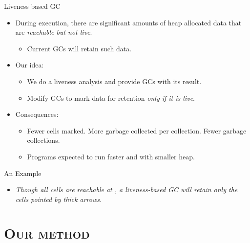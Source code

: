 \documentclass[xcolor=x11names,compress,mathserif]{beamer}
\renewcommand{\(}{\begin{columns}}
\renewcommand{\)}{\end{columns}}
\newcommand{\<}[1]{\begin{column}{#1}}
\renewcommand{\>}{\end{column}}
\begin{document}
\begin{frame}{Liveness based GC}
    \begin{itemize}\itemsep0.75em
    \item During execution, there are significant amounts of heap allocated data
      that  are {\em  reachable but not live}.
      \begin{itemize}
      \item Current GCs will retain such data.
      \end{itemize}
    \item Our idea: 
      \begin{itemize}
      \item We do a liveness analysis and provide GCs with its result.
      \item Modify GCs to mark data for retention {\em only if it is live}.
      \end{itemize}
    \item Consequences:
      \begin{itemize}
      \item  Fewer cells  marked.  \pause More  garbage collected  per
        collection. \pause Fewer garbage collections. \pause
      \item Programs expected to run faster and with smaller heap.
      \end{itemize}
    \end{itemize}
\end{frame}

\begin{frame}{An Example}


\bigskip
\begin{itemize}
\item<1->{\em   Though    all   cells   are    reachable   at
  ,  a liveness-based  GC  will retain
  only  the cells  pointed by  thick  arrows.}  
\end{itemize}
\end{frame}

\section{\scshape Our method}
\end{document}
